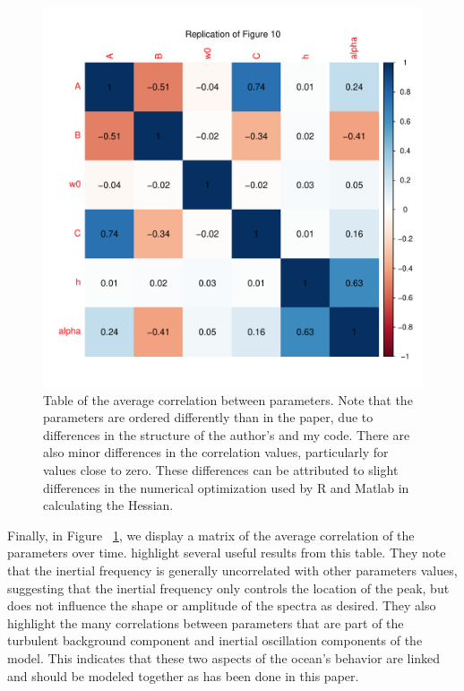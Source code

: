 \documentclass{stat572Style}
\begin{document}
 \begin{figure}[h!]
  \centering
    \includegraphics[width=.6\textwidth]{ReplicatedFigures/fig10.pdf}
        \caption{Table of the average correlation between parameters. Note that the parameters are ordered differently than in the paper, due to differences in the structure of the author's and my code. There are also minor differences in the correlation values, particularly for values close to zero. These differences can be attributed to slight differences in the numerical optimization used by R and Matlab in calculating the Hessian. }
        	\label{fig: fig10}
\end{figure}


\par Finally, in Figure ~\ref{fig: fig10}, we display a matrix of the average correlation of the parameters over time. \citet{Sykulski2016} highlight several useful results from this table. 
They note that the inertial frequency is generally uncorrelated with other parameters values, suggesting that the inertial frequency only controls the location of the peak, but does not influence the shape or amplitude of the spectra as desired. 
They also highlight the many correlations between parameters that are part of the turbulent background component and inertial oscillation components of the model. 
This indicates that these two aspects of the ocean's behavior are linked and should be modeled together as has been done in this paper. 
\end{document}
